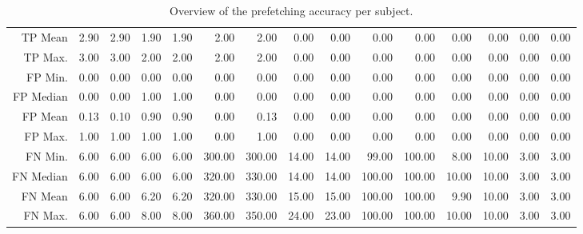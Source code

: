 \begin{table}[ht]
\begin{tabular}{rrrrrrrrrrrrrrr}
  TP Mean & 2.90 & 2.90 & 1.90 & 1.90 & 2.00 & 2.00 & 0.00 & 0.00 & 0.00 & 0.00 & 0.00 & 0.00 & 0.00 & 0.00 \\ 
  TP Max. & 3.00 & 3.00 & 2.00 & 2.00 & 2.00 & 2.00 & 0.00 & 0.00 & 0.00 & 0.00 & 0.00 & 0.00 & 0.00 & 0.00 \\ 
  FP Min. & 0.00 & 0.00 & 0.00 & 0.00 & 0.00 & 0.00 & 0.00 & 0.00 & 0.00 & 0.00 & 0.00 & 0.00 & 0.00 & 0.00 \\ 
  FP Median & 0.00 & 0.00 & 1.00 & 1.00 & 0.00 & 0.00 & 0.00 & 0.00 & 0.00 & 0.00 & 0.00 & 0.00 & 0.00 & 0.00 \\ 
  FP Mean & 0.13 & 0.10 & 0.90 & 0.90 & 0.00 & 0.13 & 0.00 & 0.00 & 0.00 & 0.00 & 0.00 & 0.00 & 0.00 & 0.00 \\ 
  FP Max. & 1.00 & 1.00 & 1.00 & 1.00 & 0.00 & 1.00 & 0.00 & 0.00 & 0.00 & 0.00 & 0.00 & 0.00 & 0.00 & 0.00 \\ 
  FN Min. & 6.00 & 6.00 & 6.00 & 6.00 & 300.00 & 300.00 & 14.00 & 14.00 & 99.00 & 100.00 & 8.00 & 10.00 & 3.00 & 3.00 \\ 
  FN Median & 6.00 & 6.00 & 6.00 & 6.00 & 320.00 & 330.00 & 14.00 & 14.00 & 100.00 & 100.00 & 10.00 & 10.00 & 3.00 & 3.00 \\ 
  FN Mean & 6.00 & 6.00 & 6.20 & 6.20 & 320.00 & 330.00 & 15.00 & 15.00 & 100.00 & 100.00 & 9.90 & 10.00 & 3.00 & 3.00 \\ 
  FN Max. & 6.00 & 6.00 & 8.00 & 8.00 & 360.00 & 350.00 & 24.00 & 23.00 & 100.00 & 100.00 & 10.00 & 10.00 & 3.00 & 3.00 \\ 
   \hline
\end{tabular}
\caption{Overview of the prefetching accuracy per subject.} 
\label{tab:results:rq3:summary:subject}
\end{table}
